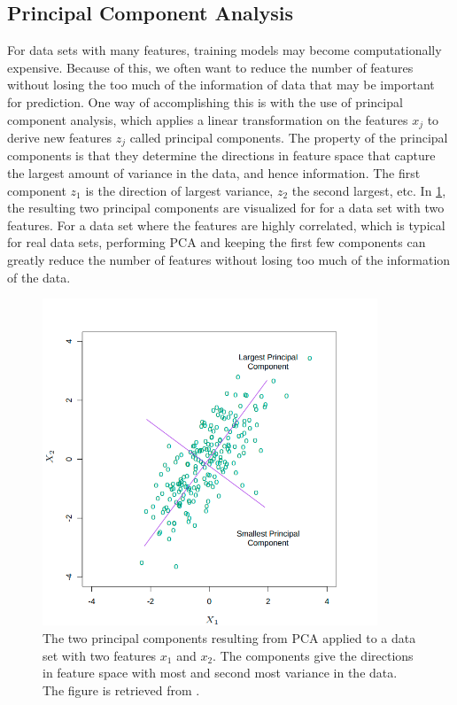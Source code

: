 \subsection{Principal Component Analysis}\label{sec:Principal Component Analysis}
For data sets with many features, training models may become computationally expensive. Because of this, we often want to reduce the number of features without losing the too much of the information of data that may be important for prediction. One way of accomplishing this is with the use of principal component analysis, which applies a linear transformation on the features $x_j$ to derive new features $z_j$ called principal components. The property of the principal components is that they determine the directions in feature space that capture the largest amount of variance in the data, and hence information. The first component $z_1$ is the direction of largest variance, $z_2$ the second largest, etc. In \cref{fig:pca}, the resulting two principal components are visualized for for a data set with two features. For a data set where the features are highly correlated, which is typical for real data sets, performing PCA and keeping the first few components can greatly reduce the number of features without losing too much of the information of the data.

\begin{figure}[H]
    \centering
    \includegraphics[width=10cm]{latex/figures/pca.png}
    \caption{The two principal components resulting from PCA applied to a data set with two features $x_1$ and $x_2$. The components give the directions in feature space with most and second most variance in the data. The figure is retrieved from \citet{hastie01statisticallearning}.}
    \label{fig:pca}
\end{figure}